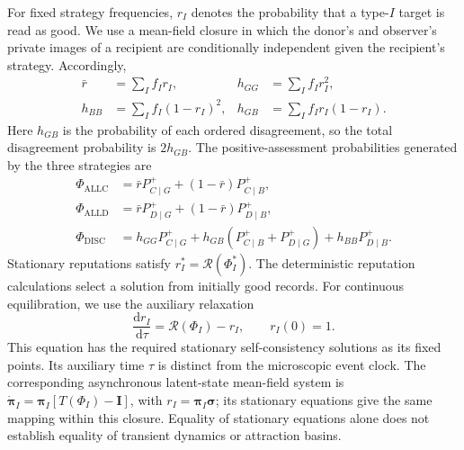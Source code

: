 \documentclass[fleqn,10pt]{article}
\begin{document}
For fixed strategy frequencies, $r_I$ denotes the probability that a type-$I$ target is read as good. We use a mean-field closure in which the donor's and observer's private images of a recipient are conditionally independent given the recipient's strategy. Accordingly,
\begin{equation}
\begin{aligned}
\bar r&=\sum_I f_Ir_I,&
h_{GG}&=\sum_I f_Ir_I^2,\\
h_{BB}&=\sum_I f_I(1-r_I)^2,&
h_{GB}&=\sum_I f_Ir_I(1-r_I).
\end{aligned}
\label{eq:methods-private-moments}
\end{equation}
Here $h_{GB}$ is the probability of each ordered disagreement, so the total disagreement probability is $2h_{GB}$. The positive-assessment probabilities generated by the three strategies are
\begin{equation}
\begin{aligned}
\Phi_{\mathrm{ALLC}}&=\bar rP^+_{C\mid G}+(1-\bar r)P^+_{C\mid B},\\
\Phi_{\mathrm{ALLD}}&=\bar rP^+_{D\mid G}+(1-\bar r)P^+_{D\mid B},\\
\Phi_{\mathrm{DISC}}&=h_{GG}P^+_{C\mid G}
+h_{GB}(P^+_{C\mid B}+P^+_{D\mid G})
+h_{BB}P^+_{D\mid B}.
\end{aligned}
\label{eq:methods-positive-assessment}
\end{equation}
Stationary reputations satisfy $r_I^*=\mathcal R(\Phi_I^*)$. The deterministic reputation calculations select a solution from initially good records. For continuous equilibration, we use the auxiliary relaxation
\begin{equation}
\frac{\mathrm dr_I}{\mathrm d\tau}=\mathcal R(\Phi_I)-r_I,
\qquad r_I(0)=1.
\label{eq:methods-reputation-dynamics}
\end{equation}
This equation has the required stationary self-consistency solutions as its fixed points. Its auxiliary time $\tau$ is distinct from the microscopic event clock. The corresponding asynchronous latent-state mean-field system is $\dot{\boldsymbol\pi}_I=\boldsymbol\pi_I[T(\Phi_I)-\mathbf I]$, with $r_I=\boldsymbol\pi_I\boldsymbol\sigma$; its stationary equations give the same mapping within this closure. Equality of stationary equations alone does not establish equality of transient dynamics or attraction basins.
\end{document}
